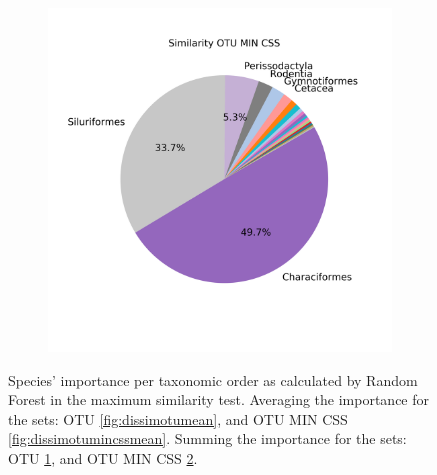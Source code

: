 \begin{figure}[h]
\begin{subfigure}{0.45\textwidth}
	\caption{}
	\label{fig:dissimotusum}
\end{subfigure}	
\begin{subfigure}{0.45\textwidth}
	\includegraphics[width=\textwidth]{rfr_dis_sum_pieOTU MIN CSS}
	\caption{}
	\label{fig:dissimotumincsssum}
\end{subfigure}
	\caption{Species' importance per taxonomic order as calculated by Random Forest in the maximum similarity test. Averaging the importance for the sets: OTU \ref{fig:dissimotumean}, and OTU MIN CSS \ref{fig:dissimotumincssmean}. Summing the importance for the sets: OTU \ref{fig:dissimotusum}, and OTU MIN CSS \ref{fig:dissimotumincsssum}. }
	\label{fig:dispieappendix}
\end{figure}
%
